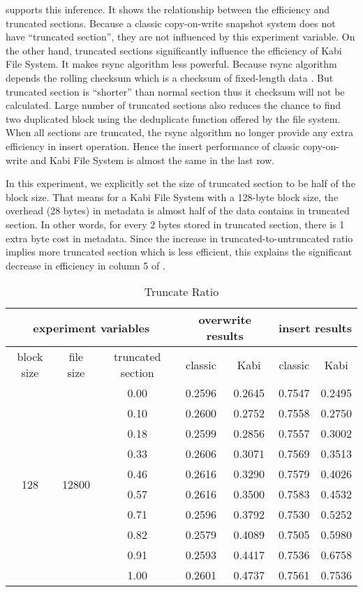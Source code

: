      supports this inference. It shows the relationship between the efficiency and truncated sections. Because a classic copy-on-write snapshot system does not have ``truncated section'', they are not influenced by this experiment variable. On the other hand, truncated sections significantly influence the efficiency of Kabi File System. It makes rsync algorithm less powerful. Because rsync algorithm depends the rolling checksum which is a checksum of fixed-length data . But truncated section is ``shorter'' than normal section thus it checksum will not be calculated. Large number of truncated sections also reduces the chance to find two duplicated block using the deduplicate function offered by the file system. When all sections are truncated, the rsync algorithm no longer provide any extra efficiency in insert operation. Hence the insert performance of classic copy-on-write and Kabi File System is almost the same in the last row.

    In this experiment, we explicitly set the size of truncated section to be half of the block size. That means for a Kabi File System with a 128-byte block size, the overhead (28 bytes) in metadata is almost half of the data contains in truncated section. In other words, for every 2 bytes stored in truncated section, there is 1 extra byte cost in metadata. Since the increase in truncated-to-untruncated ratio implies more truncated section which is less efficient, this explains the significant decrease in efficiency in column 5 of .

\begin{table}[t]
\caption{Truncate Ratio}
\label{tab:truncate_ratio}
\begin{center}
\begin{tabular}{|c|c|c|cccc|}
\hline
\multicolumn{3}{|c|}{experiment variables} & \multicolumn{2}{c|}{overwrite results} & \multicolumn{2}{c|}{insert results}\\
\hline
block size & file size & truncated section & \multicolumn{1}{c|}{classic} & \multicolumn{1}{c|}{Kabi} & \multicolumn{1}{c|}{classic} & Kabi\\
\hline
\multirow{10}{*}{128} & \multirow{10}{*}{12800} & 0.00 & 0.2596 & 0.2645 & 0.7547 & 0.2495 \\
&& 0.10 & 0.2600 & 0.2752 & 0.7558 & 0.2750 \\
&& 0.18 & 0.2599 & 0.2856 & 0.7557 & 0.3002 \\
&& 0.33 & 0.2606 & 0.3071 & 0.7569 & 0.3513 \\
&& 0.46 & 0.2616 & 0.3290 & 0.7579 & 0.4026 \\
&& 0.57 & 0.2616 & 0.3500 & 0.7583 & 0.4532 \\
&& 0.71 & 0.2596 & 0.3792 & 0.7530 & 0.5252 \\
&& 0.82 & 0.2579 & 0.4089 & 0.7505 & 0.5980 \\
&& 0.91 & 0.2593 & 0.4417 & 0.7536 & 0.6758 \\
&& 1.00 & 0.2601 & 0.4737 & 0.7561 & 0.7536 \\
\hline
\end{tabular}
\end{center}
\end{table}

